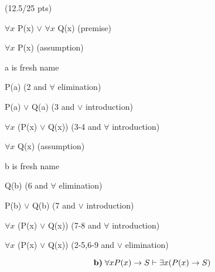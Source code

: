 \documentclass[a4paper,12pt]{article}
\newcommand\tab[1][1cm]{\hspace*{#1}}
\begin{document}
\hfill \small{(12.5/25 pts)}\\
\begin{tcolorbox}

\begin{enumerate}
    \item $\forall x$ P(x) $\vee$ $\forall x$ Q(x) \tab (premise)
    \begin{tcolorbox}
        \item $\forall x$ P(x) \tab (assumption)
        \begin{tcolorbox}
            a is fresh name
            \item P(a) \tab (2 and $\forall$ elimination)
            \item P(a) $\vee$ Q(a) \tab (3 and $\vee$ introduction)
        \end{tcolorbox}
        \item $\forall x$ (P(x) $\vee$ Q(x)) \tab   (3-4 and $\forall$ introduction)
    \end{tcolorbox}
    \begin{tcolorbox}
        \item $\forall x$ Q(x) \tab (assumption)
        \begin{tcolorbox}
            b is fresh name
            \item Q(b) \tab (6 and $\forall$ elimination)
            \item P(b) $\vee$ Q(b) \tab (7 and $\vee$ introduction)
        \end{tcolorbox}
        \item $\forall x$ (P(x) $\vee$ Q(x)) \tab   (7-8 and $\forall$ introduction)
    \end{tcolorbox}
    \item $\forall x$ (P(x) $\vee$ Q(x)) \tab   (2-5,6-9 and $\vee$ elimination)
\end{enumerate}

\end{tcolorbox}
\newpage
\begin{equation*}
    \textbf{b)} \; \forall x P(x) \rightarrow S \vdash \exists x (P(x)\rightarrow S)\\
\end{equation*}
\end{document}
